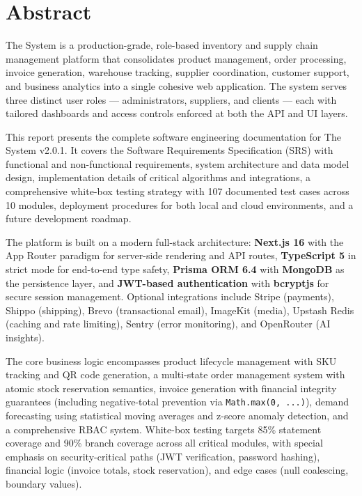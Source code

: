 \documentclass[12pt,a4paper]{report}
\begin{document}
\chapter*{Abstract}

\begin{tcolorbox}[infobox,title={Executive Summary}]
The System is a production-grade, role-based inventory and supply chain management platform that consolidates product management, order processing, invoice generation, warehouse tracking, supplier coordination, customer support, and business analytics into a single cohesive web application. The system serves three distinct user roles --- administrators, suppliers, and clients --- each with tailored dashboards and access controls enforced at both the API and UI layers.
\end{tcolorbox}

This report presents the complete software engineering documentation for The System v2.0.1. It covers the Software Requirements Specification (SRS) with functional and non-functional requirements, system architecture and data model design, implementation details of critical algorithms and integrations, a comprehensive white-box testing strategy with 107 documented test cases across 10 modules, deployment procedures for both local and cloud environments, and a future development roadmap.

The platform is built on a modern full-stack architecture: \textbf{Next.js 16} with the App Router paradigm for server-side rendering and API routes, \textbf{TypeScript 5} in strict mode for end-to-end type safety, \textbf{Prisma ORM 6.4} with \textbf{MongoDB} as the persistence layer, and \textbf{JWT-based authentication} with \textbf{bcryptjs} for secure session management. Optional integrations include Stripe (payments), Shippo (shipping), Brevo (transactional email), ImageKit (media), Upstash Redis (caching and rate limiting), Sentry (error monitoring), and OpenRouter (AI insights).

The core business logic encompasses product lifecycle management with SKU tracking and QR code generation, a multi-state order management system with atomic stock reservation semantics, invoice generation with financial integrity guarantees (including negative-total prevention via \texttt{Math.max(0, ...)}), demand forecasting using statistical moving averages and z-score anomaly detection, and a comprehensive RBAC system. White-box testing targets 85\% statement coverage and 90\% branch coverage across all critical modules, with special emphasis on security-critical paths (JWT verification, password hashing), financial logic (invoice totals, stock reservation), and edge cases (null coalescing, boundary values).
\end{document}
